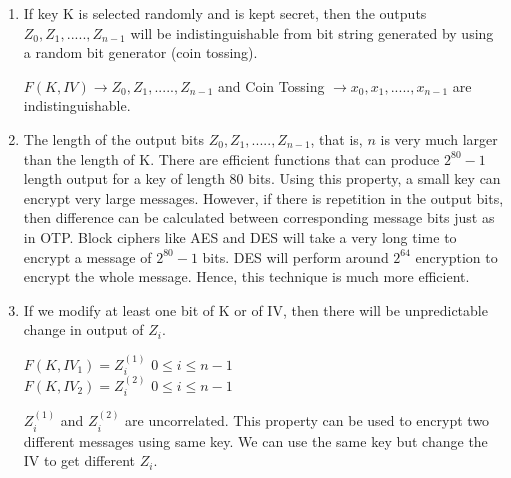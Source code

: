 \documentclass[11pt]{article}
\begin{document}
\begin{enumerate}
    \item If key K is selected randomly and is kept secret, then the outputs $Z_0, Z_1,....., Z_{n-1}$ will be indistinguishable from bit string generated by using a random bit generator (coin tossing).
    \begin{center}
        $F(K, IV) \rightarrow Z_0, Z_1,....., Z_{n-1}$ and Coin Tossing $\rightarrow x_0, x_1,....., x_{n-1}$ are indistinguishable.
    \end{center}

    \item The length of the output bits $Z_0, Z_1,....., Z_{n-1}$, that is, $n$ is very much larger than the length of K. There are efficient functions that can produce $2^{80} - 1$ length output for a key of length 80 bits. Using this property, a small key can encrypt very large messages. However, if there is repetition in the output bits, then difference can be calculated between corresponding message bits just as in OTP. Block ciphers like AES and DES will take a very long time to encrypt a message of $2^{80} - 1$ bits. DES will perform around $2^{64}$ encryption to encrypt the whole message. Hence, this technique is much more efficient.

    \item If we modify at least one bit of K or of IV, then there will be unpredictable change in output of $Z_i$. 
    \begin{center}
        $F(K, IV_1) = Z_i^{(1)}$ $0 \leq i \leq n - 1$\\
        $F(K, IV_2) = Z_i^{(2)}$ $0 \leq i \leq n - 1$\\
    \end{center}
    $Z_i^{(1)}$ and $Z_i^{(2)}$ are uncorrelated. This property can be used to encrypt two different messages using same key. We can use the same key but change the IV to get different $Z_i$.
    \begin{center}
\end{center}
\end{enumerate}
\end{document}
